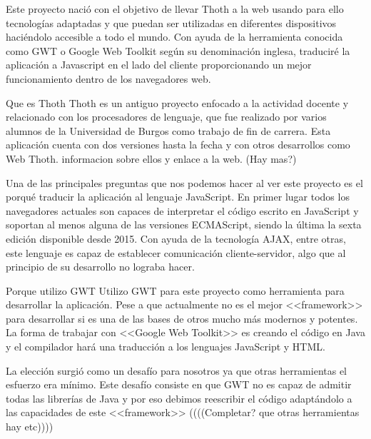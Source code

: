 
Este proyecto nació con el objetivo de llevar Thoth a la web usando para ello tecnologías adaptadas y que puedan ser utilizadas en diferentes dispositivos haciéndolo accesible a todo el mundo. Con ayuda de la herramienta conocida como GWT o Google Web Toolkit según su denominación inglesa, traduciré la aplicación a Javascript en el lado del cliente proporcionando un mejor funcionamiento dentro de los navegadores web.

Que es Thoth
Thoth es un antiguo proyecto enfocado a la actividad docente y relacionado con los procesadores de lenguaje, que fue realizado por varios alumnos de la Universidad de Burgos como trabajo de fin de carrera. Esta aplicación cuenta con dos versiones  hasta la fecha y con otros desarrollos como Web Thoth. informacion sobre ellos y enlace a la web. (Hay mas?)

Una de las principales preguntas que nos podemos hacer al ver este proyecto es el porqué traducir la aplicación al lenguaje JavaScript. 
En primer lugar todos los navegadores actuales son capaces de interpretar el código escrito en JavaScript y soportan al menos alguna de las versiones ECMAScript, siendo la última la sexta edición disponible desde 2015. Con ayuda de la tecnología AJAX, entre otras, este lenguaje es capaz de establecer comunicación cliente-servidor, algo que al principio de su desarrollo no lograba hacer. 

Porque utilizo GWT
Utilizo GWT para este proyecto como herramienta para desarrollar la aplicación. Pese a que actualmente no es el mejor <<framework>> para desarrollar si es una de las bases de otros mucho más modernos y potentes. La forma de trabajar con <<Google Web Toolkit>> es creando el código en Java y el compilador hará una traducción a los lenguajes JavaScript y HTML.

La elección surgió como un desafío para nosotros ya que otras herramientas el esfuerzo era mínimo. Este desafío consiste en que GWT no es capaz de admitir todas las librerías de Java y por eso debimos reescribir el código adaptándolo a las capacidades de este <<framework>> ((((Completar? que otras herramientas hay etc))))
